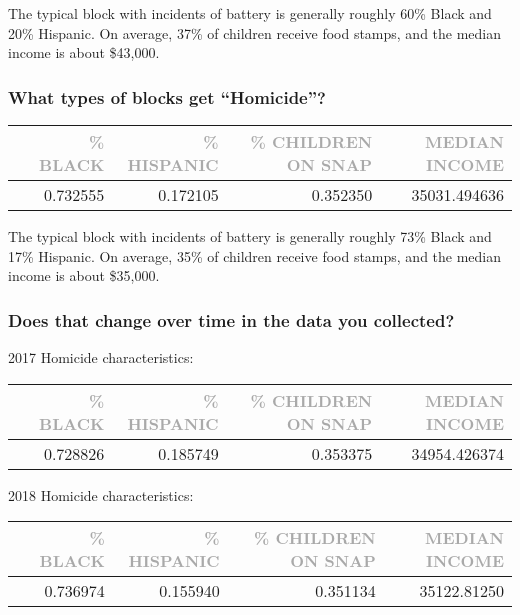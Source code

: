 \documentclass[11pt]{article}
\newcommand{\printsubsection}[1]{\normalfont\headerfontlt\textcolor{darkgray}{{#1}}}
\newcommand{\opns}[1]{\textrm{\small\printsubsection{\MakeUppercase{#1}}}}
\begin{document}
The typical block with incidents of battery is generally roughly 60\% Black and 20\% Hispanic. On average, 37\% of children receive food stamps, and the median income is about \$43,000.

\subsubsection{What types of blocks get “Homicide”?}
\begin{table}[H]
\centering\renewcommand{\arraystretch}{1.2}
\begin{tabular}{lrrrr}
   &   \opns{\% BLACK} &  \opns{\% HISPANIC} &  \opns{\% CHILDREN ON SNAP} &  \opns{MEDIAN INCOME} \\\hline
   &    0.732555 &      0.172105 &        0.352350 &   35031.494636 \\
\end{tabular}
\end{table}

The typical block with incidents of battery is generally roughly 73\% Black and 17\% Hispanic. On average, 35\% of children receive food stamps, and the median income is about \$35,000.

\subsubsection{Does that change over time in the data you collected?}
2017 Homicide characteristics:
\begin{table}[H]
\centering\renewcommand{\arraystretch}{1.2}
\begin{tabular}{lrrrr}
   &   \opns{\% BLACK} &  \opns{\% HISPANIC} &  \opns{\% CHILDREN ON SNAP} &  \opns{MEDIAN INCOME} \\\hline
   &    0.728826 &      0.185749 &        0.353375 &   34954.426374 \\
\end{tabular}
\end{table}

2018 Homicide characteristics:
\begin{table}[H]
\centering\renewcommand{\arraystretch}{1.2}
\begin{tabular}{lrrrr}
   &   \opns{\% BLACK} &  \opns{\% HISPANIC} &  \opns{\% CHILDREN ON SNAP} &  \opns{MEDIAN INCOME} \\\hline
   &    0.736974 &      0.155940 &        0.351134 &    35122.81250 \\
\end{tabular}
\end{table}
\end{document}
